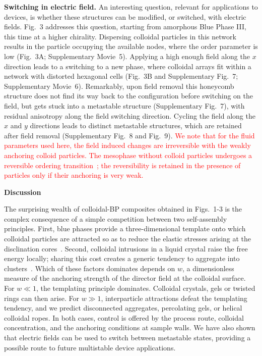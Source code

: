 \documentclass[12pt]{article}
\begin{document}
\medskip
\noindent
\textbf{Switching in electric field.}
An interesting question, relevant for applications to devices, is whether 
these structures can be modified, or switched, with electric fields.
Fig.~3 addresses this question, starting from amorphous Blue Phase III,
this time at a higher chirality. Dispersing colloidal particles in this
network
results in the particle occupying the available nodes, where the order
parameter is low (Fig.~3A; Supplementary Movie~5). Applying a high enough
field 
along the $x$ direction leads to a switching to a new phase, where colloidal 
arrays fit within a network with distorted hexagonal cells (Fig.~3B 
and Supplementary Fig.~7; Supplementary Movie~6). 
Remarkably, upon field removal this honeycomb structure does not find its 
way back to the 
configuration before switching on the field, but gets stuck into a metastable 
structure (Supplementary Fig.~7), with residual anisotropy along the field
switching 
direction. Cycling the field along the $x$ and $y$ directions leads to
distinct metastable structures, which are retained after field removal
(Supplementary Fig.~8 and Fig.~9).
\textcolor{red}{
We note that for the fluid parameters used here, the field induced
changes are irreversible with the weakly anchoring colloid particles.
The mesophase without colloid particles undergoes
a reversible ordering transition~\cite{bp3}; the reversibility
is retained in the
presence of particles only if their anchoring is very weak.}


\medskip
\noindent
\textbf{\large Discussion}

\noindent
The surprising wealth of colloidal-BP composites obtained in Figs.~1-3 is
the complex consequence of a simple competition between two self-assembly
principles. 
First, blue phases provide a three-dimensional template onto which
colloidal particles are attracted so as to reduce the elastic stresses
arising at the disclination cores~\cite{miha}. Second, colloidal intrusions
in a liquid crystal raise the free energy locally; sharing this cost creates
a generic tendency to aggregate into clusters~\cite{tiffany}. Which of these
factors dominates depends on $w$, a dimensionless measure of the anchoring
strength of the director field at the colloidal surface. For $w\ll 1$, the
templating principle dominates. Colloidal crystals, gels or twisted rings
can then arise. For $w \gg 1$, interparticle attractions defeat the
templating tendency, and we predict disconnected aggregates, percolating
gels, or helical colloidal ropes. In both cases, control is offered by the
process route, colloidal concentration, and the anchoring conditions at
sample walls. We have also shown that electric fields can be used to
switch between metastable states, providing a possible route to future
multistable device applications.
\end{document}
